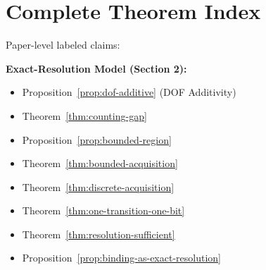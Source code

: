\section{Complete Theorem Index}\label{appendix-theorems}

Paper-level labeled claims:

\textbf{Exact-Resolution Model (Section 2):}
\begin{itemize}
\item Proposition~\ref{prop:dof-additive} (DOF Additivity)
\item Theorem~\ref{thm:counting-gap}
\item Proposition~\ref{prop:bounded-region}
\item Theorem~\ref{thm:bounded-acquisition}
\item Theorem~\ref{thm:discrete-acquisition}
\item Theorem~\ref{thm:one-transition-one-bit}
\item Theorem~\ref{thm:resolution-sufficient}
\item Proposition~\ref{prop:binding-as-exact-resolution}
\end{itemize}

